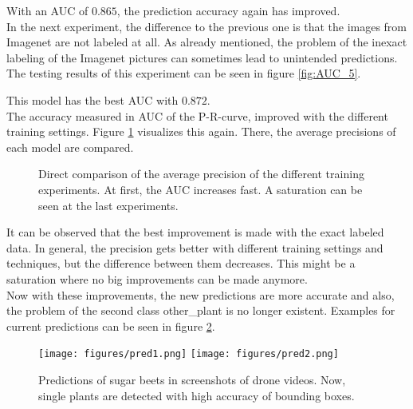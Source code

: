 With an AUC of $ 0.865 $, the prediction accuracy again has improved. \\

In the next experiment, the difference to the previous one is that the images from Imagenet are not labeled at all. As already mentioned, the problem of the inexact labeling of the Imagenet pictures can sometimes lead to unintended predictions. The testing results of this experiment can be seen in figure \ref{fig:AUC_5}.

This model has the best AUC with $ 0.872 $.\\


The accuracy measured in AUC of the P-R-curve, improved with the different training settings. Figure \ref{fig:direct_comparison} visualizes this again. There, the average precisions of each model are compared. 

\begin{figure}
	\centering
	\caption{Direct comparison of the average precision of the different training experiments. At first, the AUC increases fast. A saturation can be seen at the last experiments.}
	\label{fig:direct_comparison}
\end{figure}

It can be observed that the best improvement is made with the exact labeled data. In general, the precision gets better with different training settings and techniques, but the difference between them decreases. This might be a saturation where no big improvements can be made anymore. \\

Now with these improvements, the new predictions are more accurate and also, the problem of the second class other\_plant is no longer existent. Examples for current predictions can be seen in figure \ref{fig:current_predictions}.

\begin{figure}[htb!]
	\centering
	\texttt{[image: figures/pred1.png]}
	\texttt{[image: figures/pred2.png]}
	\caption{Predictions of sugar beets in screenshots of drone videos. Now, single plants are detected with high accuracy of bounding boxes. }
	\label{fig:current_predictions}
\end{figure}

